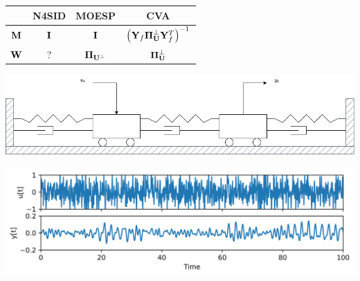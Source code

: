 \documentclass[aspectratio=169,compress,12pt,dvipsnames]{beamer}
\begin{document}
\begin{frame}
    \vfill
    \centering
    \begin{tabular}{cccc}
        &   N4SID   &   MOESP   &   CVA \\
        \hline
        $\vb{M}$    &   $\vb{I}$    &   $\vb{I}$    &   $\left( \vb{Y}_f \boldsymbol{\Pi}_{\vb{U}}^{\perp} \vb{Y}_f^T \right)^{-1}$ \\
        $\vb{W}$    &   ?           &   $\boldsymbol{\Pi}_{\vb{U}^{\perp}}$   &   $\boldsymbol{\Pi}_{\vb{U}}^{\perp}$ 
    \end{tabular}
    \vfill
\end{frame}

\begin{frame}
    \vfill
    \centering
    \includegraphics[width=.8\textwidth]{mechanical_system.png}
    \vfill
\end{frame}

\begin{frame}
    \vfill
    \centering
    \includegraphics[width=.8\textwidth]{io_data.png}
    \vfill
\end{frame}
\end{document}
